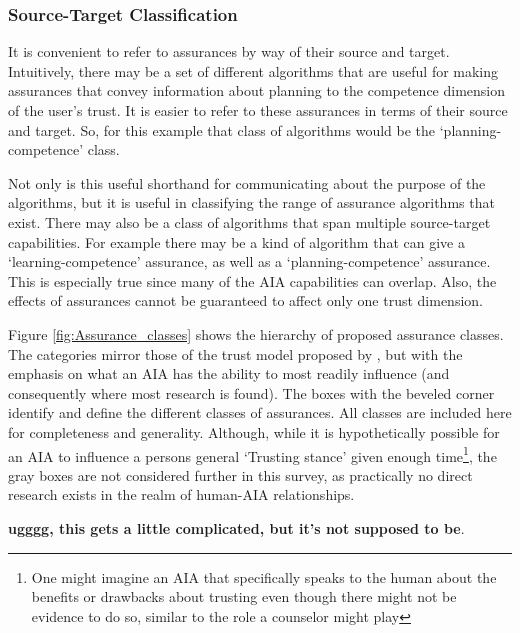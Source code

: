 \subsubsection{Source-Target Classification}
    It is convenient to refer to assurances by way of their source and target. Intuitively, there may be a set of different algorithms that are useful for making assurances that convey information about planning to the competence dimension of the user's trust. It is easier to refer to these assurances in terms of their source and target. So, for this example that class of algorithms would be the `planning-competence' class.
    
    Not only is this useful shorthand for communicating about the purpose of the algorithms, but it is useful in classifying the range of assurance algorithms that exist. There may also be a class of algorithms that span multiple source-target capabilities. For example there may be a kind of algorithm that can give a `learning-competence' assurance, as well as a `planning-competence' assurance. This is especially true since many of the AIA capabilities can overlap. Also, the effects of assurances cannot be guaranteed to affect only one trust dimension.

    Figure \ref{fig:Assurance_classes} shows the hierarchy of proposed assurance classes. The categories mirror those of the trust model proposed by \citet{McKnight2001-fa}, but with the emphasis on what an AIA has the ability to most readily influence (and consequently where most research is found). The boxes with the beveled corner identify and define the different classes of assurances. All classes are included here for completeness and generality. Although, while it is hypothetically possible for an AIA to influence a persons general `Trusting stance' given enough time\footnote{One might imagine an AIA that specifically speaks to the human about the benefits or drawbacks about trusting even though there might not be evidence to do so, similar to the role a counselor might play}, the gray boxes are not considered further in this survey, as practically no direct research exists in the realm of human-AIA relationships.

    \textbf{ugggg, this gets a little complicated, but it's not supposed to be}.
